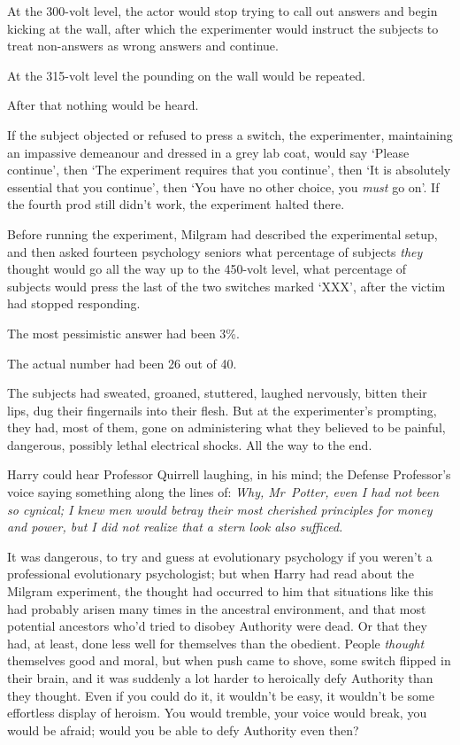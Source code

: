 At the 300-volt level, the actor would stop trying to call out answers and begin kicking at the wall, after which the experimenter would instruct the subjects to treat non-answers as wrong answers and continue.

At the 315-volt level the pounding on the wall would be repeated.

After that nothing would be heard.

If the subject objected or refused to press a switch, the experimenter, maintaining an impassive demeanour and dressed in a grey lab coat, would say `Please continue', then `The experiment requires that you continue', then `It is absolutely essential that you continue', then `You have no other choice, you \emph{must} go on'. If the fourth prod still didn't work, the experiment halted there.

Before running the experiment, Milgram had described the experimental setup, and then asked fourteen psychology seniors what percentage of subjects \emph{they} thought would go all the way up to the 450-volt level, what percentage of subjects would press the last of the two switches marked `XXX', after the victim had stopped responding.

The most pessimistic answer had been 3\%.

The actual number had been 26 out of 40.

The subjects had sweated, groaned, stuttered, laughed nervously, bitten their lips, dug their fingernails into their flesh. But at the experimenter's prompting, they had, most of them, gone on administering what they believed to be painful, dangerous, possibly lethal electrical shocks. All the way to the end.

Harry could hear Professor Quirrell laughing, in his mind; the Defense Professor's voice saying something along the lines of: \emph{Why, Mr~Potter, even I had not been so cynical; I knew men would betray their most cherished principles for money and power, but I did not realize that a stern look also sufficed.}

It was dangerous, to try and guess at evolutionary psychology if you weren't a professional evolutionary psychologist; but when Harry had read about the Milgram experiment, the thought had occurred to him that situations like this had probably arisen many times in the ancestral environment, and that most potential ancestors who'd tried to disobey Authority were dead. Or that they had, at least, done less well for themselves than the obedient. People \emph{thought} themselves good and moral, but when push came to shove, some switch flipped in their brain, and it was suddenly a lot harder to heroically defy Authority than they thought. Even if you could do it, it wouldn't be easy, it wouldn't be some effortless display of heroism. You would tremble, your voice would break, you would be afraid; would you be able to defy Authority even then?

